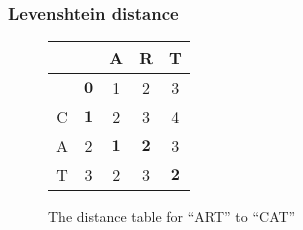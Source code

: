 \documentclass{beamer}
\begin{document}
\begin{frame}
\frametitle{Levenshtein distance}
\begin{figure}
\caption{The distance table for ``ART'' to ``CAT''}

\begin{center}
\begin{tabular}{c|c|c|c|c}
  &   & A & R & T \\
\hline
  & $\mathbf{0}$ & 1 & 2 & 3 \\
\hline
C & $\mathbf{1}$ & 2 & 3 & 4 \\
\hline
A & 2 & $\mathbf{1}$ & $\mathbf{2}$ & 3 \\
\hline
T & 3 & 2 & 3 & $\mathbf{2}$
\end{tabular}

\end{center}

\label{art2cattable}
\end{figure}

\end{frame}
\end{document}
